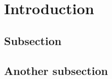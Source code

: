\section{Introduction}
\subsection{Subsection}
\lipsum[3]
\subsection{Another subsection}
\lipsum[4-5]
